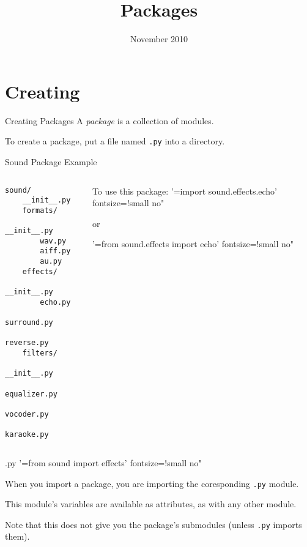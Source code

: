\documentclass{pyslides}
\title{Packages}
\date{November 2010}
\begin{document}
\begin{frame}\titlepage\end{frame}

\section{Creating}

\begin{frame}[fragile]{Creating Packages}
A \emph{package} is a collection of modules.

\bigskip

To create a package, put a file named \texttt{.py} into a directory.
\end{frame}

\begin{frame}[fragile]{Sound Package Example}
\begin{columns}[t]
\begin{column}{4cm}
\vspace{-0.25cm}
\begin{Verbatim}[fontsize=\small]
sound/
    __init__.py
    formats/
        __init__.py
        wav.py
        aiff.py
        au.py
    effects/
        __init__.py
        echo.py
        surround.py
        reverse.py
    filters/
        __init__.py
        equalizer.py
        vocoder.py
        karaoke.py
\end{Verbatim}
\bigskip
\end{column}
\begin{column}{6cm}
To use this package:
 '=import sound.effects.echo' fontsize=!small no"

or

 '=from sound.effects import echo' fontsize=!small no"
\end{column}
\end{columns}
\end{frame}

\begin{frame}[fragile]{.py}
 '=from sound import effects' fontsize=!small no"

When you import a package, you are importing the coresponding \texttt{.py} module.

This module's variables are available as attributes, as with any other module.

\bigskip

Note that this does not give you the package's submodules (unless \texttt{.py} imports them).
\end{frame}
\end{document}
